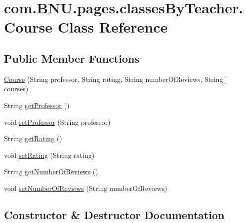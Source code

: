 \hypertarget{classcom_1_1_b_n_u_1_1pages_1_1classes_by_teacher_1_1_course}{}\section{com.\+B\+N\+U.\+pages.\+classes\+By\+Teacher.\+Course Class Reference}
\label{classcom_1_1_b_n_u_1_1pages_1_1classes_by_teacher_1_1_course}
\subsection*{Public Member Functions}
\begin{DoxyCompactItemize}
\item 
\mbox{\hyperlink{classcom_1_1_b_n_u_1_1pages_1_1classes_by_teacher_1_1_course_a55657851189f2382abef215e4184c2aa}{Course}} (String professor, String rating, String number\+Of\+Reviews, String\mbox{[}$\,$\mbox{]} courses)
\item 
String \mbox{\hyperlink{classcom_1_1_b_n_u_1_1pages_1_1classes_by_teacher_1_1_course_ac4128535b1a9aa851868ad515afbf693}{get\+Professor}} ()
\item 
void \mbox{\hyperlink{classcom_1_1_b_n_u_1_1pages_1_1classes_by_teacher_1_1_course_ab3c1842c607628e8c5e9511ad7e39ea8}{set\+Professor}} (String professor)
\item 
String \mbox{\hyperlink{classcom_1_1_b_n_u_1_1pages_1_1classes_by_teacher_1_1_course_a6e264e7a9e367465af8e3e622d5fb597}{get\+Rating}} ()
\item 
void \mbox{\hyperlink{classcom_1_1_b_n_u_1_1pages_1_1classes_by_teacher_1_1_course_af9d2ef22cd95b22e2c8504a1040f2708}{set\+Rating}} (String rating)
\item 
String \mbox{\hyperlink{classcom_1_1_b_n_u_1_1pages_1_1classes_by_teacher_1_1_course_ae8173cfe6c3e9c083dd1ba6fa6c7e349}{get\+Number\+Of\+Reviews}} ()
\item 
void \mbox{\hyperlink{classcom_1_1_b_n_u_1_1pages_1_1classes_by_teacher_1_1_course_ae18b783a5aa9db40c0b5532adc5b5f2c}{set\+Number\+Of\+Reviews}} (String number\+Of\+Reviews)
\end{DoxyCompactItemize}


\subsection{Constructor \& Destructor Documentation}
\mbox{\label{classcom_1_1_b_n_u_1_1pages_1_1classes_by_teacher_1_1_course_a55657851189f2382abef215e4184c2aa}} 
